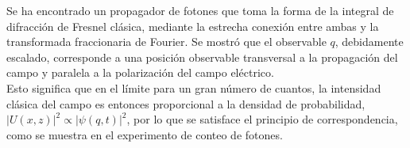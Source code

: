     Se ha encontrado un propagador de fotones que toma la forma de la integral de difracción de Fresnel clásica, mediante la estrecha conexión entre ambas y la transformada fraccionaria de Fourier. Se mostró que el observable $q$, debidamente escalado, corresponde a una posición observable transversal a la propagación del campo y paralela a la polarización del campo eléctrico. \\
    Esto significa que en el límite para un gran número de cuantos, la intensidad clásica del campo es entonces proporcional a la densidad de probabilidad, $|U(x,z)|^{2} \propto |\psi(q,t)|^{2}$, por lo que se satisface el principio de correspondencia, como se muestra en el experimento de conteo de fotones.